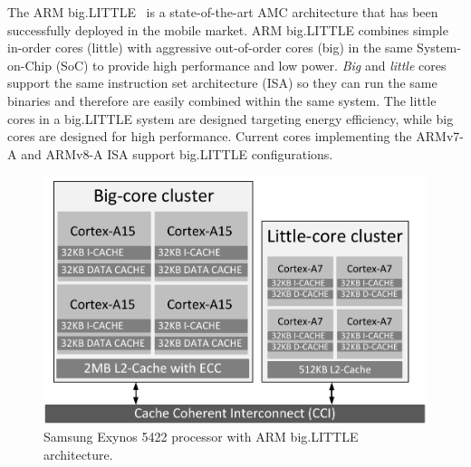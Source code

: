 
The ARM big.LITTLE~\cite{samsung, Greenhalgh2011} is a state-of-the-art AMC architecture that has been successfully deployed in the mobile market. 
ARM big.LITTLE combines simple in-order cores (little) with aggressive out-of-order cores (big) in the same System-on-Chip (SoC) to provide high performance and low power. 
\textit{Big} and \textit{little} cores support the same instruction set architecture (ISA) so they can run the same binaries and therefore are easily combined within the same system.
The little cores in a big.LITTLE system are designed targeting energy efficiency, while big cores are designed for high performance.
Current cores implementing the ARMv7-A and ARMv8-A ISA support big.LIT\-TLE configurations. 


\begin{figure}[t]
	\centering
	\includegraphics[width=0.5\columnwidth]{figures/block_diagram.pdf}%
	\caption{Samsung Exynos 5422 processor with ARM big.LITTLE architecture.}%
	\label{fig:big-little-diagram}%
	\vspace{-0.56cm}
\end{figure}


